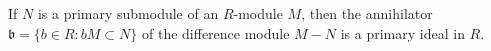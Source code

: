 If $N$ is a primary submodule of an $R$-module $M$, then the annihilator $\mathfrak{b} = \{b \in R : bM \subset N\}$ of the difference module $M - N$ is a primary ideal in $R$.
